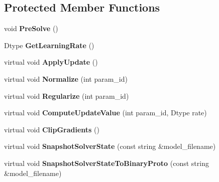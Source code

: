 \subsection*{Protected Member Functions}
\begin{DoxyCompactItemize}
\item 
\mbox{\label{classcaffe_1_1_s_g_d_solver_a6488286ff665df1907d64a92d4acf835}} 
void {\bfseries Pre\+Solve} ()
\item 
\mbox{\label{classcaffe_1_1_s_g_d_solver_a985436c42815498163a3d74fdb64ee70}} 
Dtype {\bfseries Get\+Learning\+Rate} ()
\item 
\mbox{\label{classcaffe_1_1_s_g_d_solver_a6a461fcea902238150520695c0b9afc5}} 
virtual void {\bfseries Apply\+Update} ()
\item 
\mbox{\label{classcaffe_1_1_s_g_d_solver_af6a4841b33eb75c327b57bbd9618d362}} 
virtual void {\bfseries Normalize} (int param\+\_\+id)
\item 
\mbox{\label{classcaffe_1_1_s_g_d_solver_a58c7580080ad737c214dd666c9314999}} 
virtual void {\bfseries Regularize} (int param\+\_\+id)
\item 
\mbox{\label{classcaffe_1_1_s_g_d_solver_abed831880d7e91cccffba2283cb131a4}} 
virtual void {\bfseries Compute\+Update\+Value} (int param\+\_\+id, Dtype rate)
\item 
\mbox{\label{classcaffe_1_1_s_g_d_solver_af6843c11d78770721752379fd8c1f6d8}} 
virtual void {\bfseries Clip\+Gradients} ()
\item 
\mbox{\label{classcaffe_1_1_s_g_d_solver_a99abb8ec20584dda556e9700df425ed9}} 
virtual void {\bfseries Snapshot\+Solver\+State} (const string \&model\+\_\+filename)
\item 
\mbox{\label{classcaffe_1_1_s_g_d_solver_a86d3bc01f9262416cc3cac669993ea46}} 
virtual void {\bfseries Snapshot\+Solver\+State\+To\+Binary\+Proto} (const string \&model\+\_\+filename)

\end{DoxyCompactItemize}
